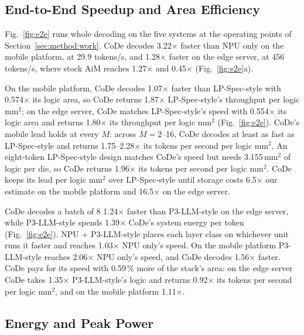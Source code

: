 \subsection{End-to-End Speedup and Area Efficiency}
\label{sec:eval:e2e}

Fig.~\ref{fig:e2e} runs whole decoding on the five systems at the operating points of Section~\ref{sec:method:work}.
CoDe decodes
3.22$\times$ faster than NPU only on the mobile platform, at 29.9 tokens/s, and 1.28$\times$ faster on the edge server,
at 456 tokens/s, where stock AiM reaches 1.27$\times$ and 0.45$\times$ (Fig.~\ref{fig:e2e}a).

On the mobile platform, CoDe decodes 1.07$\times$ faster than LP-Spec-style with 0.574$\times$ its logic area, so CoDe
returns 1.87$\times$ LP-Spec-style's throughput per logic mm$^2$; on the edge server, CoDe matches LP-Spec-style's speed
with 0.554$\times$ its logic area and returns 1.80$\times$ its throughput per logic mm$^2$ (Fig.~\ref{fig:e2e}). CoDe's
mobile lead holds at every $M$: across $M = 2$--16, CoDe decodes at least as fast as
LP-Spec-style and returns 1.75--2.28$\times$ its tokens per second per logic mm$^2$. An eight-token LP-Spec-style design matches
CoDe's speed but needs 3.155\,mm$^2$ of logic per die, so CoDe returns 1.96$\times$ its tokens per second per logic
mm$^2$. CoDe keeps its lead per logic
mm$^2$ over LP-Spec-style until storage costs 6.5$\times$ our estimate on the mobile platform and 16.5$\times$ on the
edge server.

CoDe decodes a batch of 8 1.24$\times$ faster than P3-LLM-style on the edge server, while P3-LLM-style spends
1.39$\times$ CoDe's system energy per token (Fig.~\ref{fig:e2e}). NPU + P3-LLM-style places each layer class on whichever unit runs it faster and reaches
1.03$\times$ NPU only's speed. On the mobile platform P3-LLM-style reaches 2.06$\times$ NPU only's speed, and CoDe
decodes 1.56$\times$ faster. CoDe pays for its speed with 0.59\,\% more of the stack's area: on the edge server CoDe
takes 1.35$\times$ P3-LLM-style's logic and returns 0.92$\times$ its tokens per second per logic mm$^2$, and on the
mobile platform 1.11$\times$.

\subsection{Energy and Peak Power}
\label{sec:eval:energy}

